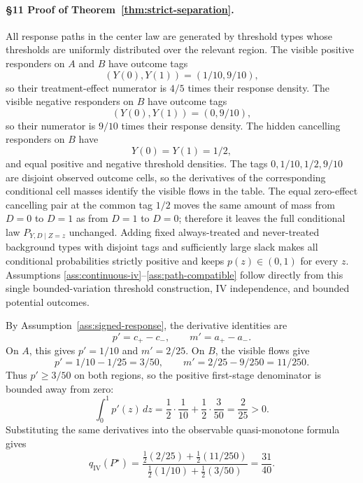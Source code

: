 \paragraph{\S11 Proof of Theorem~\ref{thm:strict-separation}.}
All response paths in the center law are generated by threshold types whose
thresholds are uniformly distributed over the relevant region.  The visible
positive responders on \(A\) and \(B\) have outcome tags
\[
(Y(0),Y(1))=(1/10,9/10),
\]
so their treatment-effect numerator is \(4/5\) times their response density.
The visible negative responders on \(B\) have outcome tags
\[
(Y(0),Y(1))=(0,9/10),
\]
so their numerator is \(9/10\) times their response density.  The hidden
cancelling responders on \(B\) have
\[
Y(0)=Y(1)=1/2,
\]
and equal positive and negative threshold densities.  The tags
\(0,1/10,1/2,9/10\) are disjoint observed outcome cells, so the derivatives of
the corresponding conditional cell masses identify the visible flows in the
table.  The equal zero-effect cancelling pair at the common tag \(1/2\) moves
the same amount of mass from \(D=0\) to \(D=1\) as from \(D=1\) to \(D=0\);
therefore it leaves the full conditional law \(P_{Y,D\mid Z=z}\) unchanged.
Adding fixed always-treated and never-treated background types with disjoint
tags and sufficiently large slack makes all conditional probabilities strictly
positive and keeps \(p(z)\in(0,1)\) for every \(z\).  Assumptions
\ref{ass:continuous-iv}--\ref{ass:path-compatible} follow directly from this
single bounded-variation threshold construction, IV independence, and bounded
potential outcomes.

By Assumption~\ref{ass:signed-response}, the derivative identities are
\[
p'=c_+-c_-,
\qquad
m'=a_+-a_-.
\]
On \(A\), this gives \(p'=1/10\) and \(m'=2/25\).  On \(B\), the visible
flows give
\[
p'=1/10-1/25=3/50,
\qquad
m'=2/25-9/250=11/250.
\]
Thus \(p'\ge3/50\) on both regions, so the positive first-stage denominator is
bounded away from zero:
\[
\int_0^1p'(z)\,dz
=
\frac12\cdot\frac1{10}+\frac12\cdot\frac3{50}
=\frac2{25}>0.
\]
Substituting the same derivatives into the observable quasi-monotone formula
gives
\[
q_{\mathrm{IV}}(P^\star)
=
\frac{\frac12(2/25)+\frac12(11/250)}
     {\frac12(1/10)+\frac12(3/50)}
=\frac{31}{40}.
\]

